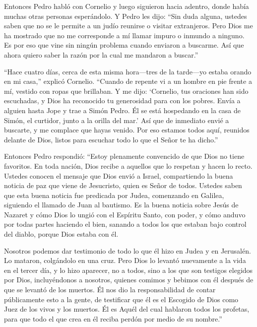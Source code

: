  Entonces Pedro habló con Cornelio y luego siguieron hacia
adentro, donde había muchas otras personas esperándolo.  Y
Pedro les dijo: ``Sin duda alguna, ustedes saben que no se le permite a
un judío reunirse o visitar extranjeros. Pero Dios me ha mostrado que no
me corresponde a mí llamar impuro o inmundo a ninguno.  Es
por eso que vine sin ningún problema cuando enviaron a buscarme. Así que
ahora quiero saber la razón por la cual me mandaron a buscar.''

 ``Hace cuatro días, cerca de esta misma hora---tres de la
tarde---yo estaba orando en mi casa,'' explicó Cornelio. ``Cuando de
repente vi a un hombre en pie frente a mí, vestido con ropas que
brillaban.  Y me dijo: `Cornelio, tus oraciones han sido
escuchadas, y Dios ha reconocido tu generosidad para con los pobres.
 Envía a alguien hasta Jope y trae a Simón Pedro. Él se
está hospedando en la casa de Simón, el curtidor, junto a la orilla del
mar.'  Así que de inmediato envié a buscarte, y me complace
que hayas venido. Por eso estamos todos aquí, reunidos delante de Dios,
listos para escuchar todo lo que el Señor te ha dicho.''

 Entonces Pedro respondió: ``Estoy plenamente convencido de
que Dios no tiene favoritos.  En toda nación, Dios recibe a
aquellos que lo respetan y hacen lo recto.  Ustedes conocen
el mensaje que Dios envió a Israel, compartiendo la buena noticia de paz
que viene de Jesucristo, quien es Señor de todos.  Ustedes
saben que esta buena noticia fue predicada por Judea, comenzando en
Galilea, siguiendo el llamado de Juan al bautismo.  Es la
buena noticia sobre Jesús de Nazaret y cómo Dios lo ungió con el
Espíritu Santo, con poder, y cómo anduvo por todas partes haciendo el
bien, sanando a todos los que estaban bajo control del diablo, porque
Dios estaba con él.

 Nosotros podemos dar testimonio de todo lo que él hizo en
Judea y en Jerusalén. Lo mataron, colgándolo en una cruz. 
Pero Dios lo levantó nuevamente a la vida en el tercer día, y lo hizo
aparecer,  no a todos, sino a los que son testigos elegidos
por Dios, incluyéndonos a nosotros, quienes comimos y bebimos con él
después de que se levantó de los muertos.  Él nos dio la
responsabilidad de contar públicamente esto a la gente, de testificar
que él es el Escogido de Dios como Juez de los vivos y los muertos.
 Él es Aquél del cual hablaron todos los profetas, para que
todo el que crea en él reciba perdón por medio de su nombre.''

